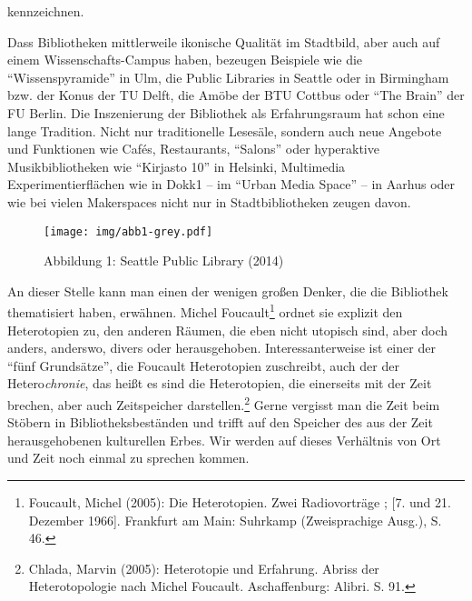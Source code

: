 kennzeichnen.

Dass Bibliotheken mittlerweile ikonische Qualität im Stadtbild, aber
auch auf einem Wissenschafts-Campus haben, bezeugen Beispiele wie die
\enquote{Wissenspyramide} in Ulm, die Public Libraries in Seattle oder
in Birmingham bzw. der Konus der TU Delft, die Amöbe der BTU Cottbus
oder \enquote{The Brain} der FU Berlin. Die Inszenierung der Bibliothek
als Erfahrungsraum hat schon eine lange Tradition. Nicht nur
traditionelle Lesesäle, sondern auch neue Angebote und Funktionen wie
Cafés, Restaurants, \enquote{Salons} oder hyperaktive Musikbibliotheken
wie \enquote{Kirjasto 10} in Helsinki, Multimedia Experimentierflächen
wie in Dokk1 -- im \enquote{Urban Media Space} -- in Aarhus oder wie bei
vielen Makerspaces nicht nur in Stadtbibliotheken zeugen davon.

\begin{figure}[htbp]
\centering
\texttt{[image: img/abb1-grey.pdf]}
\caption*{Abbildung 1: Seattle Public Library (2014)}
\end{figure}

An dieser Stelle kann man einen der wenigen großen Denker, die die
Bibliothek thematisiert haben, erwähnen. Michel Foucault\footnote{Foucault,
  Michel (2005): Die Heterotopien. Zwei Radiovorträge ; {[}7. und 21.
  Dezember 1966{]}. Frankfurt am Main: Suhrkamp (Zweisprachige Ausg.),
  S. 46.} ordnet sie explizit den Heterotopien zu, den anderen Räumen,
die eben nicht utopisch sind, aber doch anders, anderswo, divers oder
herausgehoben. Interessanterweise ist einer der \enquote{fünf
Grundsätze}, die Foucault Heterotopien zuschreibt, auch der der
Hetero\emph{chronie}, das heißt es sind die Heterotopien, die einerseits
mit der Zeit brechen, aber auch Zeitspeicher darstellen.\footnote{Chlada,
  Marvin (2005): Heterotopie und Erfahrung. Abriss der Heterotopologie
  nach Michel Foucault. Aschaffenburg: Alibri. S. 91.} Gerne vergisst
man die Zeit beim Stöbern in Bibliotheksbeständen und trifft auf den
Speicher des aus der Zeit herausgehobenen kulturellen Erbes. Wir werden
auf dieses Verhältnis von Ort und Zeit noch einmal zu sprechen kommen.

